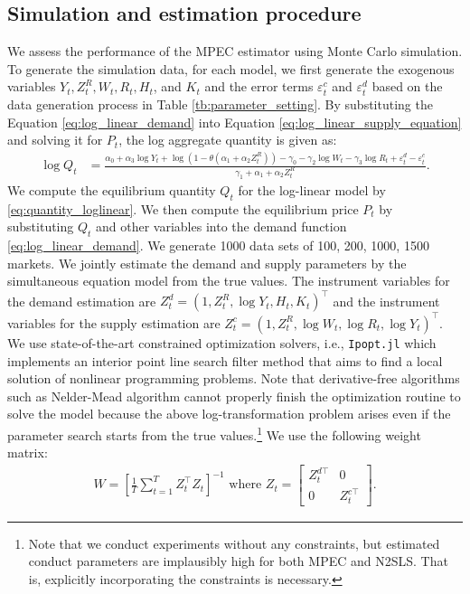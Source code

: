 \documentclass[11pt, a4paper]{article}
\begin{document}
\subsection{Simulation and estimation procedure}\label{sec:setting}
We assess the performance of the MPEC estimator using Monte Carlo simulation.
To generate the simulation data, for each model, we first generate the exogenous variables $Y_t, Z^{R}_{t}, W_t, R_{t}, H_t$, and $K_t$ and the error terms $\varepsilon_{t}^c$ and $\varepsilon_{t}^d$ based on the data generation process in Table \ref{tb:parameter_setting}.
By substituting the Equation \eqref{eq:log_linear_demand} into Equation \eqref{eq:log_linear_supply_equation} and solving it for $P_{t}$, the log aggregate quantity is given as: 
\begin{align}
    \log Q_t &= \frac{ \alpha_0 + \alpha_3 \log Y_t + \log (1 - \theta (\alpha_1 + \alpha_2 Z^{R}_{t})) - \gamma_0  -  \gamma_2 \log W_{t} - \gamma_3 \log R_t + \varepsilon^{d}_{t} - \varepsilon^{c}_{t}}{\gamma_1+ \alpha_1 + \alpha_2 Z^{R}_{t} }.\label{eq:quantity_loglinear}
\end{align}
We compute the equilibrium quantity $Q_{t}$ for the log-linear model by \eqref{eq:quantity_loglinear}.
We then compute the equilibrium price $P_t$ by substituting $Q_{t}$ and other variables into the demand function \eqref{eq:log_linear_demand}.
We generate 1000 data sets of 100, 200, 1000, 1500 markets.
We jointly estimate the demand and supply parameters by the simultaneous equation model \citep{wooldridge2010econometric} from the true values.
The instrument variables for the demand estimation are $Z^{d}_{t} = (1, Z^{R}_{t}, \log Y_t, H_{t}, K_{t})^\top$ and the instrument variables for the supply estimation are $Z^{c}_{t} = (1, Z^{R}_{t}, \log W_{t}, \log R_{t}, \log Y_t)^\top$. 
We use state-of-the-art constrained optimization solvers, i.e., \texttt{Ipopt.jl} which implements an interior point line search filter method that aims to find a local solution of nonlinear programming problems.
Note that derivative-free algorithms such as Nelder-Mead algorithm cannot properly finish the optimization routine to solve the model because the above log-transformation problem arises even if the parameter search starts from the true values.\footnote{Note that we conduct experiments without any constraints, but estimated conduct parameters are implausibly high for both MPEC and N2SLS. That is, explicitly incorporating the constraints is necessary.}
We use the following weight matrix:
\begin{align}
    W = \left[\frac{1}{T}\sum_{t = 1}^T Z_t^\top Z_t\right]^{-1} \text{ where } Z_{t}=\left[\begin{array}{ll}
        Z_{t}^{d\top} & 0 \\
        0 & Z_{t}^{c\top}
    \end{array}\right].\label{eq:weight_matrix}
\end{align}
\end{document}
